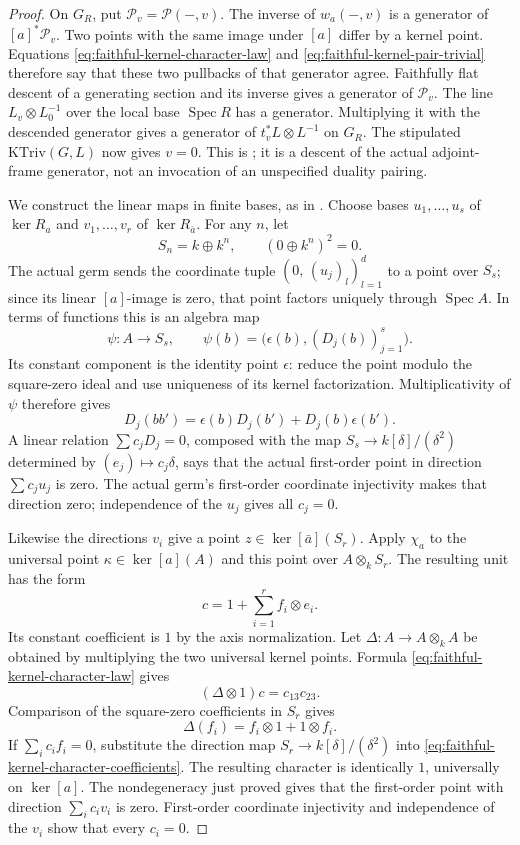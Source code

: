 \begin{proof}
On \(G_R\), put \(\mathcal P_v=\mathcal P(-,v)\).
The inverse of \(w_a(-,v)\) is a generator of
\([a]^*\mathcal P_v\).  Two points with the same image under
\([a]\) differ by a kernel point.  Equations
\eqref{eq:faithful-kernel-character-law} and
\eqref{eq:faithful-kernel-pair-trivial} therefore say that these
two pullbacks of that generator agree.  Faithfully flat descent
of a generating section and its inverse gives a generator of
\(\mathcal P_v\).  The line \(L_v\otimes L_0^{-1}\) over the local
base \(\operatorname{Spec}R\) has a generator.  Multiplying it
with the descended generator gives a generator of
\(t_v^*L\otimes L^{-1}\) on \(G_R\).
The stipulated \(\mathrm{KTriv}(G,L)\) now gives \(v=0\).
This is ; it is a descent of the actual
adjoint-frame generator, not an invocation of an unspecified
duality pairing.

We construct the linear maps in finite bases, as in
.  Choose bases
\(u_1,\ldots,u_s\) of \(\ker R_a\) and
\(v_1,\ldots,v_r\) of \(\ker R_{\bar a}\).
For any \(n\), let
\[
     S_n=k\oplus k^n,\qquad (0\oplus k^n)^2=0 .
\]
The actual germ sends the coordinate tuple
\((0,\,(u_j)_l)_{l=1}^d\) to a point over \(S_s\);
since its linear \([a]\)-image is zero, that point factors
uniquely through \(\operatorname{Spec}A\).
In terms of functions this is an algebra map
\[
       \psi:A\longrightarrow S_s,\qquad
       \psi(b)=\bigl(\epsilon(b),(D_j(b))_{j=1}^s\bigr).
\]
Its constant component is the identity point \(\epsilon\):
reduce the point modulo the square-zero ideal and use uniqueness
of its kernel factorization.  Multiplicativity of \(\psi\)
therefore gives
\[
 D_j(bb')=\epsilon(b)D_j(b')+D_j(b)\epsilon(b').
 \tag{KG6}\label{eq:faithful-kernel-derivation}
\]
A linear relation \(\sum c_jD_j=0\), composed with the map
\(S_s\to k[\delta]/(\delta^2)\) determined by
\((e_j)\mapsto c_j\delta\), says that the actual first-order
point in direction \(\sum c_j u_j\) is zero.
The actual germ's first-order coordinate injectivity makes that
direction zero; independence of the \(u_j\) gives all \(c_j=0\).

Likewise the directions \(v_i\) give a point
\(z\in\ker[\bar a](S_r)\).
Apply \(\chi_a\) to the universal point
\(\kappa\in\ker[a](A)\) and this point over
\(A\otimes_k S_r\).  The resulting unit has the form
\[
             c=1+\sum_{i=1}^r f_i\otimes e_i .
 \tag{KG7}\label{eq:faithful-kernel-character-coefficients}
\]
Its constant coefficient is \(1\) by the axis normalization.
Let \(\Delta:A\to A\otimes_kA\) be obtained by multiplying the
two universal kernel points.  Formula
\eqref{eq:faithful-kernel-character-law} gives
\[
   (\Delta\otimes1)c=c_{13}c_{23}.
\]
Comparison of the square-zero coefficients in \(S_r\) gives
\[
                   \Delta(f_i)=f_i\otimes1+1\otimes f_i.
 \tag{KG8}\label{eq:faithful-kernel-primitives}
\]
If \(\sum_i c_i f_i=0\), substitute the direction map
\(S_r\to k[\delta]/(\delta^2)\) into
\eqref{eq:faithful-kernel-character-coefficients}.
The resulting character is identically \(1\), universally on
\(\ker[a]\).  The nondegeneracy just proved gives that the
first-order point with direction \(\sum_i c_i v_i\) is zero.
First-order coordinate injectivity and independence of the
\(v_i\) show that every \(c_i=0\).


\end{proof}
